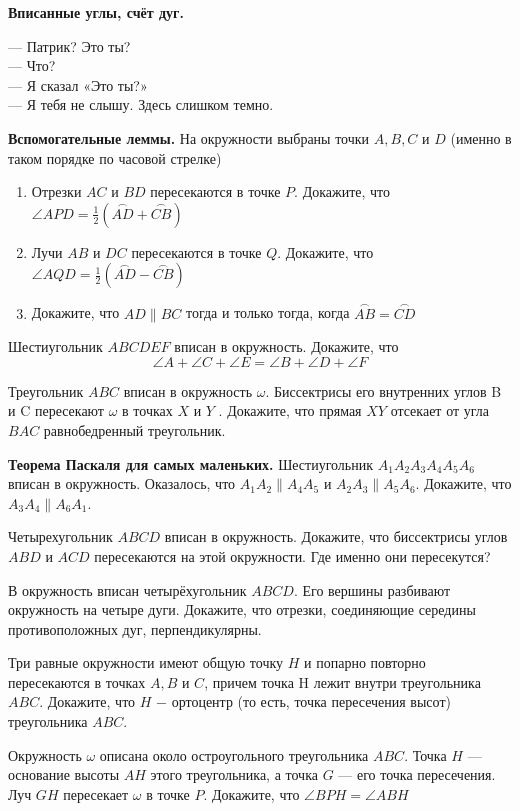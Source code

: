 \centerline{\bf \Huge Вписанные углы, счёт дуг.}

\begin{flushright}
        \scriptsize{— Патрик? Это ты?\\
                    — Что?\\
                    — Я сказал «Это ты?»\\
                    — Я тебя не слышу. Здесь слишком темно.
}
\end{flushright}

\textbf{Вспомогательные леммы.} На окружности выбраны точки $A, B, C$ и $D$ (именно в таком порядке по часовой стрелке)

\begin{enumerate}
    \item[(a)] Отрезки \( AC \) и \( BD \) пересекаются в точке \( P \). Докажите, что \( \angle APD = \frac{1}{2} (\overset{\frown}{AD} + \overset{\frown}{CB}) \)
    
    \item[(b)] Лучи \( AB \) и \( DC \) пересекаются в точке \( Q \). Докажите, что \( \angle AQD = \frac{1}{2} (\overset{\frown}{AD} - \overset{\frown}{CB}) \)
    
    \item[(c)] Докажите, что \( AD \parallel BC \) тогда и только тогда, когда \( \overset{\frown}{AB} = \overset{\frown}{CD} \)
\end{enumerate}

Шестиугольник $ABCDEF$ вписан в окружность. Докажите, что
\[\angle A + \angle C + \angle E = \angle B + \angle D + \angle F\]

Треугольник $ABC$ вписан в окружность $\omega$. Биссектрисы его внутренних углов B и C пересекают $\omega$ в точках $X$ и $Y$ . Докажите, что прямая $XY$ отсекает от угла $BAC$ равнобедренный треугольник.

\textbf{Теорема Паскаля для самых маленьких.} Шестиугольник \( A_1 A_2 A_3 A_4 A_5 A_6 \) вписан в окружность. Оказалось, что \( A_1 A_2 \parallel A_4 A_5 \) и \( A_2 A_3 \parallel A_5 A_6 \). Докажите, что \( A_3 A_4 \parallel A_6 A_1 \).

Четырехугольник $ABCD$ вписан в окружность. Докажите, что биссектрисы углов $ABD$ и $ACD$ пересекаются на этой окружности. Где именно они пересекутся?

В окружность вписан четырёхугольник $ABCD$. Его вершины разбивают окружность на четыре дуги. Докажите, что отрезки, соединяющие середины противоположных дуг, перпендикулярны.

Три равные окружности имеют общую точку $H$ и попарно повторно пересекаются в точках $A, B$ и $C$, причем точка H лежит внутри треугольника $ABC$. Докажите, что $H$ $-$ ортоцентр (то есть, точка пересечения высот) треугольника $ABC$.

Окружность $\omega$ описана около остроугольного треугольника $ABC.$ Точка $H$ --- основание высоты $AH$ этого треугольника, а точка $G$ --- его точка пересечения. Луч $GH$ пересекает $\omega$ в точке $P.$ Докажите, что $\angle BPH = \angle ABH$
